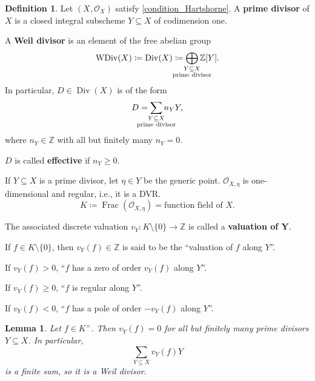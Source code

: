 \documentclass[12pt]{article}
\DeclareMathOperator{\Frac}{Frac}
\DeclareMathOperator{\WDiv}{WDiv}
\DeclareMathOperator{\Div}{Div}
\newtheorem*{lemma}{Lemma}
\theoremstyle{definition}
\newtheorem*{definition}{Definition}
\begin{document}
\begin{definition}
Let $(X,\mathcal O_X)$ satisfy \eqref{condition_Hartshorne}. A \textbf{prime divisor} of $X$ is a closed integral subscheme $Y\subseteq X$ of codimension one.

A \textbf{Weil divisor} is an element of the free abelian group
\[\WDiv(X)\coloneqq\Div(X)\coloneqq\bigoplus_{\mathclap{\substack{Y\subseteq X\\\text{prime divisor}}}}\mathbb Z[Y].\]
In particular, $D\in\Div(X)$ is of the form
\[D=\sum_{\mathclap{\substack{Y\subseteq X\\\text{prime divisor}}}}n_YY,\]
where $n_Y\in\mathbb Z$ with all but finitely many $n_Y=0$.

$D$ is called \textbf{effective} if $n_Y\geq0$.

If $Y\subseteq X$ is a prime divisor, let $\eta\in Y$ be the generic point. $\mathcal O_{X,\eta}$ is one-dimensional and regular, i.e., it is a DVR.
\[K\coloneqq\Frac(\mathcal O_{X,\eta})=\text{function field of }X.\]

The associated discrete valuation $v_Y:K\setminus\{0\}\rightarrow\mathbb Z$ is called a \textbf{valuation of $\boldsymbol Y$}.

If $f\in K\setminus\{0\}$, then $v_Y(f)\in\mathbb Z$ is said to be the ``valuation of $f$ along $Y$''.

If $v_Y(f)>0$, ``$f$ has a zero of order $v_Y(f)$ along $Y$''.

If $v_Y(f)\geq0$, ``$f$ is regular along $Y$''.

If $v_Y(f)<0$, ``$f$ has a pole of order $-v_Y(f)$ along $Y$''.
\end{definition}

\begin{lemma}
Let $f\in K^\times$. Then $v_Y(f)=0$ for all but finitely many prime divisors $Y\subseteq X$. In particular,
\[\sum_{Y\subseteq X}v_Y(f)Y\]
is a finite sum, so it is a Weil divisor.
\end{lemma}
\end{document}
